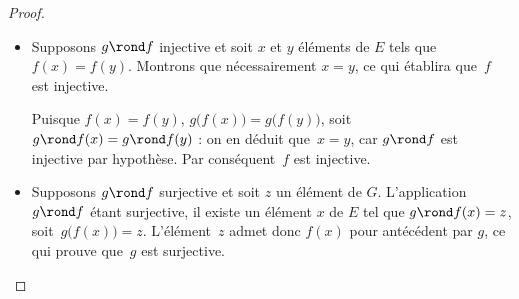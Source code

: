 \begin{proof}
\begin{itemize}
\item Supposons  $g\rond f$ injective et soit $x$ et $y$ éléments de $E$ tels que~\mbox{$f(x)=f(y)$}. Montrons que nécessairement $x=y$, ce qui établira que~$f$ est injective.

Puisque $f(x)=f(y)$, $g\bigl(f(x)\bigr)=g\bigl(f(y)\bigr)$, soit $g\rond f(x)=g\rond f(y)$ : on en déduit que~$x=y$, car $g\rond f$ est injective par hypothèse. Par conséquent~$f$ est injective.
\item Supposons  $g\rond f$ surjective et soit $z$ un élément de $G$. L'application~$g\rond f$ étant surjective, il existe un élément $x$ de $E$ tel que $g\rond f(x)=z$, soit~$g\bigl(f(x)\bigr)=z$. L'élément~$z$ admet donc $f(x)$ pour antécédent par $g$, ce qui prouve que~$g$ est surjective. \qedhere
\end{itemize}
\end{proof}
\endinput